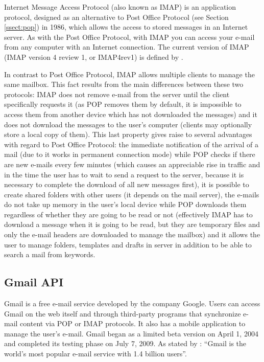 Internet Message Access Protocol (also known as IMAP) is an application protocol, designed as an alternative to Post Office Protocol (see Section \ref{ssect:pop}) in 1986, which allows the access to stored messages in an Internet server. As with the Post Office Protocol, with IMAP you can access your e-mail from any computer with an Internet connection. The current version of IMAP (IMAP version 4 review 1, or IMAP4rev1) is defined by \cite{rfc3501}.

In contrast to Post Office Protocol, IMAP allows multiple clients to manage the same mailbox. This fact results from the main differences between these two protocols: IMAP does not remove e-mail from the server until the client specifically requests it (as POP removes them by default, it is impossible to access them from another device which has not downloaded the messages) and it does not download the messages to the user's computer (clients may optionally store a local copy of them). This last property gives raise to several advantages with regard to Post Office Protocol: the immediate notification of the arrival of a mail (due to it works in permanent connection mode) while POP checks if there are new e-mails every few minutes (which causes an appreciable rise in traffic and in the time the user has to wait to send a request to the server, because it is necessary to complete the download of all new messages first), it is possible to create shared folders with other users (it depends on the mail server), the e-mails do not take up memory in the user's local device while POP downloads them regardless of whether they are going to be read or not (effectively IMAP has to download a message when it is going to be read, but they are temporary files and only the e-mail headers are downloaded to manage the mailbox) and it allows the user to manage folders, templates and drafts in server in addition to be able to search a mail from keywords.

\subsection{Gmail API}\label{ssect:gmailapi}
Gmail is a free e-mail service developed by the company Google. Users can access Gmail on the web itself and through third-party programs that synchronize e-mail content via POP or IMAP protocols. It also has a mobile application to manage the user's e-mail. Gmail began as a limited beta version on April 1, 2004 and completed its testing phase on July 7, 2009. As stated by \cite{gmailbbc}: ``Gmail is the world's most popular e-mail service with 1.4 billion users''.

